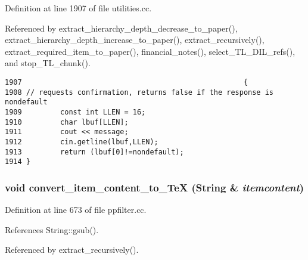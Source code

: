 Definition at line 1907 of file utilities.cc.

Referenced by extract\_\-hierarchy\_\-depth\_\-decrease\_\-to\_\-paper(), extract\_\-hierarchy\_\-depth\_\-increase\_\-to\_\-paper(), extract\_\-recursively(), extract\_\-required\_\-item\_\-to\_\-paper(), financial\_\-notes(), select\_\-TL\_\-DIL\_\-refs(), and stop\_\-TL\_\-chunk().



\footnotesize\begin{verbatim}1907                                                    {
1908 // requests confirmation, returns false if the response is nondefault
1909         const int LLEN = 16;
1910         char lbuf[LLEN];
1911         cout << message;
1912         cin.getline(lbuf,LLEN);
1913         return (lbuf[0]!=nondefault);
1914 }
\end{verbatim}\normalsize 
{}
\subsubsection{\setlength{\rightskip}{0pt plus 5cm}void convert\_\-item\_\-content\_\-to\_\-Te\-X ({\bf String} \& {\em itemcontent})}\label{dil2al_8hh_a357}




Definition at line 673 of file ppfilter.cc.

References String::gsub().

Referenced by extract\_\-recursively().



